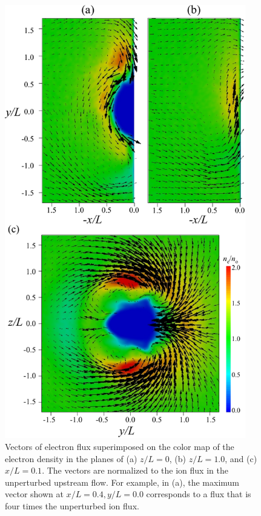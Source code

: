 \documentclass[draft,jgrga]{agutex2015}
\begin{document}
\begin{article}
\begin{figure}[h]
\centering
\noindent\includegraphics[width=10.5cm]{./figures/Fig_6_bb-crop.pdf}
\caption{
Vectors of electron flux superimposed on the color map 
of the electron density in the planes of (a) $z/L=0$, (b) $z/L=1.0$, and (c) $x/L=0.1$.
The vectors are normalized to the ion flux in the unperturbed upstream flow.
For example, in (a), the maximum vector shown at $x/L=0.4, y/L=0.0$
corresponds to a flux that is four times the unperturbed ion flux.
}
\label{fig:6}
\end{figure}


\end{article}
\end{document}
